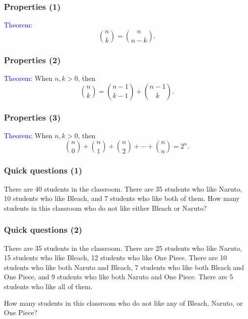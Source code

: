 \begin{frame}\frametitle{Properties (1)}
  \textcolor{blue}{Theorem:} $${n\choose k}={n\choose n-k}.$$

  \vspace{2.5in}
\end{frame}

\begin{frame}\frametitle{Properties (2)}
  \textcolor{blue}{Theorem:} When $n,k>0$, then
  $${n\choose k}={n-1\choose k-1} + {n-1\choose k}.$$

  \vspace{2.5in}
\end{frame}

\begin{frame}\frametitle{Properties (3)}
  \textcolor{blue}{Theorem:} When $n,k>0$, then
  $${n\choose 0}+{n\choose 1}+{n\choose 2}+\cdots+{n\choose n}=2^n.$$

  \vspace{2.5in}
\end{frame}

\begin{frame}\frametitle{Quick questions (1)}
  \begin{tcolorbox}
    There are 40 students in the classroom.  There are 35 students who
    like Naruto, 10 students who like Bleach, and 7 students who like
    both of them.  How many students in this classroom who do not like
    either Bleach or Naruto?
  \end{tcolorbox}

  \vspace{2in}
\end{frame}

\begin{frame}\frametitle{Quick questions (2)}
  \begin{tcolorbox}
    There are 35 students in the classroom.  There are 25 students who
    like Naruto, 15 students who like Bleach, 12 students who like One
    Piece.  There are 10 students who like both Naruto and Bleach, 7
    students who like both Bleach and One Piece, and 9 students who
    like both Naruto and One Piece.  There are 5 students who like all
    of them.

    How many students in this classroom who do not like any of Bleach,
    Naruto, or One Piece?
  \end{tcolorbox}

  \vspace{1.2in}
\end{frame}

